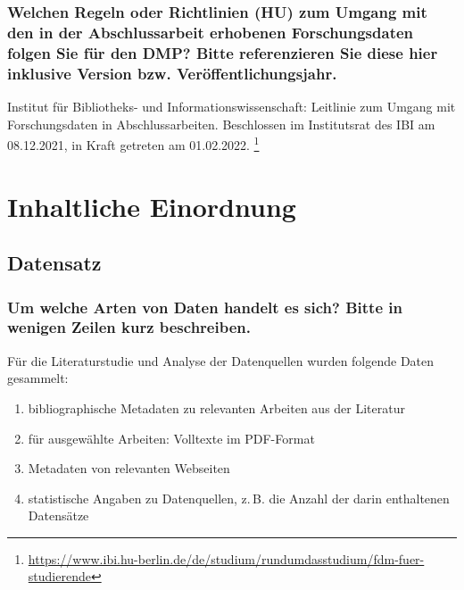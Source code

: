 \documentclass[%
  11pt,
  DIV=16,
  a4paper,
  BCOR=15mm,
  twoside=on,
  bibliography=totoc,
  headings=normal,
  numbers=noendperiod,
]{scrartcl}
\begin{document}
\subsubsection{Welchen Regeln oder Richtlinien (HU) zum Umgang mit den in der Abschlussarbeit erhobenen Forschungsdaten folgen Sie für den DMP? Bitte referenzieren Sie diese hier inklusive Version bzw. Veröffentlichungsjahr.}

Institut für Bibliotheks- und Informationswissenschaft:
Leitlinie zum Umgang mit Forschungsdaten in Abschlussarbeiten.
Beschlossen im Institutsrat des IBI am 08.12.2021, in Kraft getreten am 01.02.2022.%
\footnote{\url{https://www.ibi.hu-berlin.de/de/studium/rundumdasstudium/fdm-fuer-studierende}}

\section{Inhaltliche Einordnung}


\subsection{Datensatz}

\subsubsection{Um welche Arten von Daten handelt es sich? Bitte in wenigen Zeilen kurz beschreiben.}

Für die Literaturstudie und Analyse der Datenquellen wurden folgende Daten gesammelt:
%
\begin{enumerate}[(1)]
  \item
    bibliographische Metadaten zu relevanten Arbeiten aus der Literatur 
  \item
    für ausgewählte Arbeiten: Volltexte im PDF-Format
  \item
    Metadaten von relevanten Webseiten
  \item
    statistische Angaben zu Datenquellen, z.\,B. die Anzahl der darin enthaltenen Datensätze
\end{enumerate}
\end{document}

